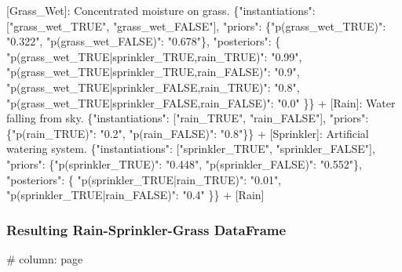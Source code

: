 \documentclass[
  11pt,
  letterpaper,
]{book}
\newenvironment{Shaded}{\begin{snugshade}}{\end{snugshade}}
\newcommand{\CommentTok}[1]{\textcolor[rgb]{0.37,0.37,0.37}{#1}}
\newcommand{\NormalTok}[1]{\textcolor[rgb]{0.00,0.23,0.31}{#1}}
\newcommand{\OtherTok}[1]{\textcolor[rgb]{0.00,0.23,0.31}{#1}}
\newcommand{\SpecialStringTok}[1]{\textcolor[rgb]{0.13,0.47,0.30}{#1}}
\begin{document}
\begin{landscape}
\begin{Shaded}
\begin{Highlighting}[]
\OtherTok{[Grass\_Wet]: }\NormalTok{Concentrated moisture on grass. \{"instantiations": }\CommentTok{[}\OtherTok{"grass\_wet\_TRUE", "grass\_wet\_FALSE"}\CommentTok{]}\NormalTok{,}
\NormalTok{ "priors": \{"p(grass\_wet\_TRUE)": "0.322", "p(grass\_wet\_FALSE)": "0.678"\},}
\NormalTok{ "posteriors": \{}
\NormalTok{   "p(grass\_wet\_TRUE|sprinkler\_TRUE,rain\_TRUE)": "0.99",}
\NormalTok{   "p(grass\_wet\_TRUE|sprinkler\_TRUE,rain\_FALSE)": "0.9",}
\NormalTok{   "p(grass\_wet\_TRUE|sprinkler\_FALSE,rain\_TRUE)": "0.8",}
\NormalTok{   "p(grass\_wet\_TRUE|sprinkler\_FALSE,rain\_FALSE)": "0.0"}
\NormalTok{ \}\}}
\SpecialStringTok{ + }\CommentTok{[}\OtherTok{Rain}\CommentTok{]}\NormalTok{: Water falling from sky. \{"instantiations": }\CommentTok{[}\OtherTok{"rain\_TRUE", "rain\_FALSE"}\CommentTok{]}\NormalTok{,}
\NormalTok{    "priors": \{"p(rain\_TRUE)": "0.2", "p(rain\_FALSE)": "0.8"\}\}}
\SpecialStringTok{ + }\CommentTok{[}\OtherTok{Sprinkler}\CommentTok{]}\NormalTok{: Artificial watering system. \{"instantiations": }\CommentTok{[}\OtherTok{"sprinkler\_TRUE", "sprinkler\_FALSE"}\CommentTok{]}\NormalTok{,}
\NormalTok{    "priors": \{"p(sprinkler\_TRUE)": "0.448", "p(sprinkler\_FALSE)": "0.552"\},}
\NormalTok{    "posteriors": \{}
\NormalTok{      "p(sprinkler\_TRUE|rain\_TRUE)": "0.01",}
\NormalTok{      "p(sprinkler\_TRUE|rain\_FALSE)": "0.4"}
\NormalTok{    \}\}}
\SpecialStringTok{   + }\CommentTok{[}\OtherTok{Rain}\CommentTok{]}
\end{Highlighting}
\end{Shaded}

\subsubsection*{Resulting Rain-Sprinkler-Grass
DataFrame}\label{resulting-rain-sprinkler-grass-dataframe}

\#\textbar{} column: page


\end{landscape}
\end{document}
